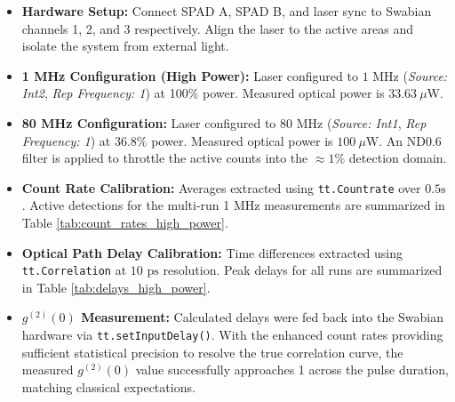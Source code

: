 \begin{itemize}
    \item \textbf{Hardware Setup:} Connect SPAD A, SPAD B, and laser sync to Swabian channels 1, 2, and 3 respectively. Align the laser to the active areas and isolate the system from external light.
    \item \textbf{1 MHz Configuration (High Power):} Laser configured to $1\text{ MHz}$ (\textit{Source: Int2}, \textit{Rep Frequency: 1}) at 100\% power. Measured optical power is $33.63\ \mu\text{W}$.
    \item \textbf{80 MHz Configuration:} Laser configured to $80\text{ MHz}$ (\textit{Source: Int1}, \textit{Rep Frequency: 1}) at 36.8\% power. Measured optical power is $100\ \mu\text{W}$. An ND0.6 filter is applied to throttle the active counts into the $\approx 1\%$ detection domain.
    \item \textbf{Count Rate Calibration:} Averages extracted using \texttt{tt.Countrate} over $0.5\text{s}$. Active detections for the multi-run 1 MHz measurements are summarized in Table \ref{tab:count_rates_high_power}.
    \item \textbf{Optical Path Delay Calibration:} Time differences extracted using \texttt{tt.Correlation} at $10\text{ ps}$ resolution. Peak delays for all runs are summarized in Table \ref{tab:delays_high_power}.
    \item \textbf{$g^{(2)}(0)$ Measurement:} Calculated delays were fed back into the Swabian hardware via \texttt{tt.setInputDelay()}. With the enhanced count rates providing sufficient statistical precision to resolve the true correlation curve, the measured $g^{(2)}(0)$ value successfully approaches 1 across the pulse duration, matching classical expectations.
\end{itemize}

\begin{table}[htbp]
    \centering
    \caption{Average count rates (cps) over $0.5\text{s}$ (1 MHz Source)}
    \label{tab:count_rates_high_power}
\end{table}

